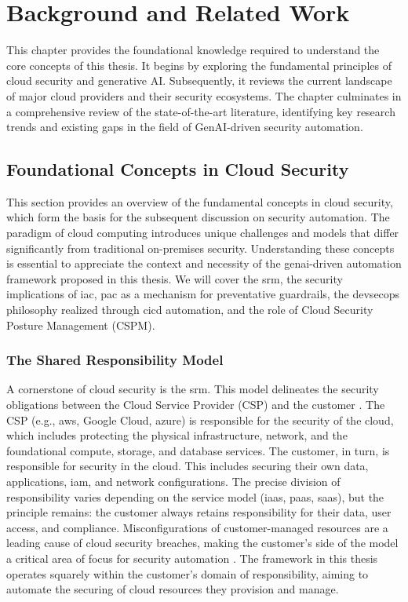 
\chapter{Background and Related Work} %
\label{chap:Background and Related Work}

This chapter provides the foundational knowledge required to understand the core concepts of this thesis. It begins by exploring the fundamental principles of cloud security and generative AI. Subsequently, it reviews the current landscape of major cloud providers and their security ecosystems. The chapter culminates in a comprehensive review of the state-of-the-art literature, identifying key research trends and existing gaps in the field of GenAI-driven security automation.

\section{Foundational Concepts in Cloud Security}
\label{sec:foundational_cloud_security}

This section provides an overview of the fundamental concepts in cloud security, which form the basis for the subsequent discussion on security automation. The paradigm of cloud computing introduces unique challenges and models that differ significantly from traditional on-premises security. Understanding these concepts is essential to appreciate the context and necessity of the \gls{genai}-driven automation framework proposed in this thesis. We will cover the \gls{srm}, the security implications of \gls{iac}, \gls{pac} as a mechanism for preventative guardrails, the \gls{devsecops} philosophy realized through \gls{cicd} automation, and the role of Cloud Security Posture Management (CSPM).

\subsection{The Shared Responsibility Model}
A cornerstone of cloud security is the \gls{srm}. This model delineates the security obligations between the Cloud Service Provider (CSP) and the customer \cite{amazon_web_services_shared_2025}. The CSP (e.g., \gls{aws}, Google Cloud, \gls{azure}) is responsible for the security of the cloud, which includes protecting the physical infrastructure, network, and the foundational compute, storage, and database services. The customer, in turn, is responsible for security in the cloud. This includes securing their own data, applications, \gls{iam}, and network configurations. The precise division of responsibility varies depending on the service model (\gls{iaas}, \gls{paas}, \gls{saas}), but the principle remains: the customer always retains responsibility for their data, user access, and compliance. Misconfigurations of customer-managed resources are a leading cause of cloud security breaches, making the customer's side of the model a critical area of focus for security automation \cite{cloud_security_alliance_mitigating_2023}. The framework in this thesis operates squarely within the customer's domain of responsibility, aiming to automate the securing of cloud resources they provision and manage.

